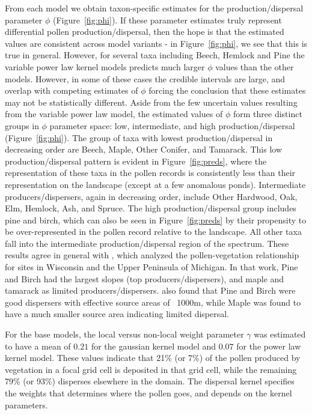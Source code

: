 \documentclass[12pt]{article}
\begin{document}
From each model we obtain taxon-specific estimates for the
production/dispersal parameter $\phi$ (Figure~\ref{fig:phi}). If these
parameter estimates truly represent differential pollen
production/dispersal, then the hope is that the estimated values are
consistent across model variants - in Figure~\ref{fig:phi}, we see
that this is true in general. However, for several taxa including
Beech, Hemlock and Pine the variable power law kernel models predicts
much larger $\phi$ values than the other models. However, in some of
these cases the credible intervals are large, and overlap with
competing estimates of $\phi$ forcing the conclusion that these
estimates may not be statistically different. Aside from the few
uncertain values resulting from the variable power law model, the
estimated values of $\phi$ form three distinct groups in $\phi$
parameter space: low, intermediate, and high production/dispersal
(Figure~\ref{fig:phi}). The group of taxa with lowest
production/dispersal in decreasing order are Beech, Maple, Other
Conifer, and Tamarack. This low production/dispersal pattern is
evident in Figure~\ref{fig:preds}, where the representation of these
taxa in the pollen records is consistently less than their
representation on the landscape (except at a few anomalous
ponds). Intermediate producers/dispersers, again in decreasing order,
include Other Hardwood, Oak, Elm, Hemlock, Ash, and Spruce. The high
production/dispersal group includes pine and birch, which can also be
seen in Figure~\ref{fig:preds} by their propensity to be
over-represented in the pollen record relative to the landscape. All
other taxa fall into the intermediate production/dispersal region of
the spectrum. These results agree in general with
\citet{prentice1986}, which analyzed the pollen-vegetation
relationship for sites in Wisconsin and the Upper Peninsula of
Michigan. In that work, Pine and Birch had the largest slopes (top
producers/dispersers), and maple and tamarack as limited
producers/dispersers. \cite{jackson1990} also found that Pine and
Birch were good dispersers with effective source areas of ~1000m,
while Maple was found to have a much smaller source area indicating
limited dispersal.

For the base models, the local versus non-local weight parameter
$\gamma$ was estimated to have a mean of $0.21$ for the gaussian
kernel model and $0.07$ for the power law kernel model. These values
indicate that 21\% (or 7\%) of the pollen produced by vegetation in a
focal grid cell is deposited in that grid cell, while the remaining
79\% (or 93\%) disperses elsewhere in the domain. The dispersal kernel
specifies the weights that determines where the pollen goes, and
depends on the kernel parameters. 
\end{document}
